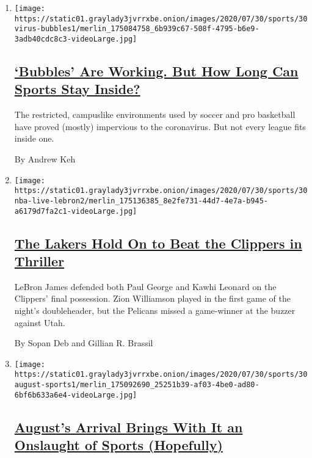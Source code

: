 \begin{enumerate}
\def\labelenumi{\arabic{enumi}.}
\item
  \texttt{[image: https://static01.graylady3jvrrxbe.onion/images/2020/07/30/sports/30virus-bubbles1/merlin\_175084758\_6b939c67-508f-4795-b6e9-3adb40cdc8c3-videoLarge.jpg]}

  \hypertarget{bubbles-are-working-but-how-long-can-sports-stay-inside}{%
  \subsection{\texorpdfstring{\href{/2020/07/30/sports/basketball/sports-bubble-nba-mlb.html}{`Bubbles'
  Are Working. But How Long Can Sports Stay
  Inside?}}{`Bubbles' Are Working. But How Long Can Sports Stay Inside?}}\label{bubbles-are-working-but-how-long-can-sports-stay-inside}}

  The restricted, campuslike environments used by soccer and pro
  basketball have proved (mostly) impervious to the coronavirus. But not
  every league fits inside one.

  By Andrew Keh
\item
  \texttt{[image: https://static01.graylady3jvrrxbe.onion/images/2020/07/30/sports/30nba-live-lebron2/merlin\_175136385\_8e2fe731-44d7-4e7a-b945-a6179d7fa2c1-videoLarge.jpg]}

  \hypertarget{the-lakers-hold-on-to-beat-the-clippers-in-thriller}{%
  \subsection{\texorpdfstring{\href{/2020/07/30/sports/basketball/clippers-lakers.html}{The
  Lakers Hold On to Beat the Clippers in
  Thriller}}{The Lakers Hold On to Beat the Clippers in Thriller}}\label{the-lakers-hold-on-to-beat-the-clippers-in-thriller}}

  LeBron James defended both Paul George and Kawhi Leonard on the
  Clippers' final possession. Zion Williamson played in the first game
  of the night's doubleheader, but the Pelicans missed a game-winner at
  the buzzer against Utah.

  By Sopan Deb and Gillian R. Brassil
\item
  \texttt{[image: https://static01.graylady3jvrrxbe.onion/images/2020/07/30/sports/30august-sports1/merlin\_175092690\_25251b39-af03-4be0-ad80-6bf6b633a6e4-videoLarge.jpg]}

  \hypertarget{augusts-arrival-brings-with-it-an-onslaught-of-sports-hopefully}{%
  \subsection{\texorpdfstring{\href{/2020/07/30/sports/nhl-us-open-champions-league-restart.html}{August's
  Arrival Brings With It an Onslaught of Sports
  (Hopefully)}}{August's Arrival Brings With It an Onslaught of Sports (Hopefully)}}\label{augusts-arrival-brings-with-it-an-onslaught-of-sports-hopefully}}


\end{enumerate}
